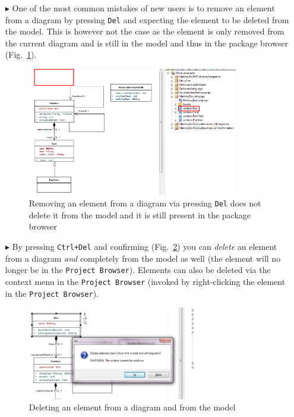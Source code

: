 \begin{enumerate}
\item[$\blacktriangleright$] One of the most common mistakes of new users is to remove an element from a diagram by pressing \texttt{Del} and expecting the element to be deleted from the model.   
This is however not the case as the element is only removed from the current diagram and is still in the model and thus in the package browser (Fig.~\ref{fig_DelVsCtrlDel01}).

\begin{figure}[htbp]
\begin{center} 
\includegraphics[width=0.87\textwidth]{pics/tricks/DelVsCtrlDel/DelVsCtrlDel1}
  \caption{Removing an element from a diagram via pressing \texttt{Del} does not delete it from the model and it is still present in the package browser}  
    \label{fig_DelVsCtrlDel01}
\end{center}
\end{figure}  

\item[$\blacktriangleright$] By pressing \texttt{Ctrl+Del} and confirming (Fig.~\ref{fig_DelVsCtrlDel02}) you can \emph{delete} an element from a diagram \emph{and} completely from the model as well (the element will no longer be in the \texttt{Project Browser}).
Elements can also be deleted via the context menu in the \texttt{Project Browser} (invoked by right-clicking the element in the \texttt{Project Browser}).

\begin{figure}[htbp]
\begin{center}
  \includegraphics[width=0.7\textwidth]{pics/tricks/DelVsCtrlDel/DelVsCtrlDel2.png}
  \caption{Deleting an element from a diagram and from the model}  
  \label{fig_DelVsCtrlDel02}
\end{center}
\end{figure}  

\end{enumerate}

